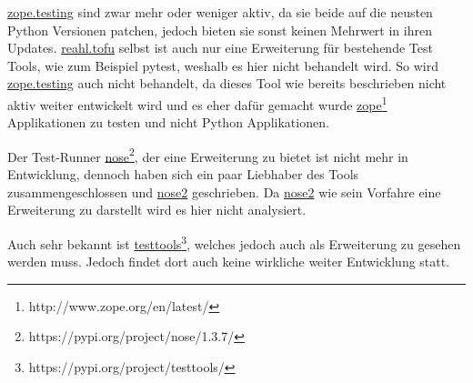 \href{https://pypi.org/project/zope.testing/}{zope.testing} sind zwar mehr oder weniger aktiv, da sie
beide auf die neusten Python Versionen patchen, jedoch bieten sie sonst keinen Mehrwert in ihren Updates.
\href{https://www.reahl.org/docs/4.0/devtools/tofu.d.html}{reahl.tofu} selbst ist
auch nur eine Erweiterung für bestehende Test Tools, wie zum Beispiel pytest, weshalb es hier nicht behandelt wird. So wird
\href{https://pypi.org/project/zope.testing/}{zope.testing} auch nicht behandelt, da dieses Tool
wie bereits beschrieben nicht aktiv weiter entwickelt wird und es eher dafür gemacht wurde \href{http://www.zope.org/en/latest/}{zope}\footnote{http://www.zope.org/en/latest/}
Applikationen zu testen und nicht Python Applikationen.

Der Test-Runner \href{https://pypi.org/project/nose/1.3.7/}{nose}\footnote{https://pypi.org/project/nose/1.3.7/}, der eine Erweiterung
zu  bietet ist nicht mehr in Entwicklung, dennoch haben sich ein paar Liebhaber des Tools zusammengeschlossen
und \href{https://pypi.org/project/nose2/}{nose2} geschrieben.
Da \href{https://pypi.org/project/nose2/}{nose2} wie sein Vorfahre eine Erweiterung zu 
darstellt wird es hier nicht analysiert.

Auch sehr bekannt ist \href{https://pypi.org/project/testtools/}{testtools}\footnote{https://pypi.org/project/testtools/}, welches jedoch auch als
Erweiterung zu  gesehen werden muss. Jedoch findet dort auch keine wirkliche weiter Entwicklung statt.

